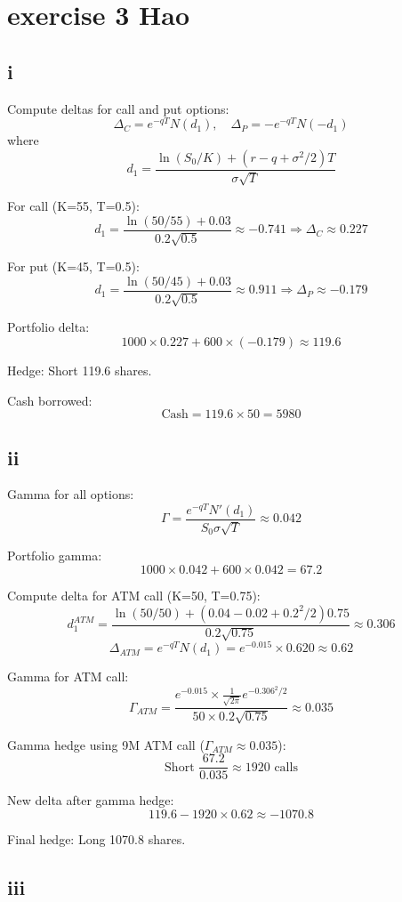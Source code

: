 \documentclass{article}
\begin{document}
\section{exercise 3 Hao}
\subsection{i}
Compute deltas for call and put options:
\[
\Delta_C = e^{-qT}N(d_1), \quad \Delta_P = -e^{-qT}N(-d_1)
\]
where
\[
d_1 = \frac{\ln(S_0/K)+(r-q+\sigma^2/2)T}{\sigma\sqrt{T}}
\]

For call (K=55, T=0.5):
\[
d_1 = \frac{\ln(50/55)+0.03}{0.2\sqrt{0.5}} \approx -0.741 \Rightarrow \Delta_C \approx 0.227
\]

For put (K=45, T=0.5):
\[
d_1 = \frac{\ln(50/45)+0.03}{0.2\sqrt{0.5}} \approx 0.911 \Rightarrow \Delta_P \approx -0.179
\]

Portfolio delta:
\[
1000\times0.227 + 600\times(-0.179) \approx 119.6
\]

Hedge: Short 119.6 shares.

Cash borrowed:
\[
\text{Cash} = 119.6 \times 50 = 5980
\]

\subsection{ii}

Gamma for all options:
\[
\Gamma = \frac{e^{-qT}N'(d_1)}{S_0\sigma\sqrt{T}} \approx 0.042
\]

Portfolio gamma:
\[
1000\times0.042 + 600\times0.042 = 67.2
\]

Compute delta for ATM call (K=50, T=0.75):
\[
d_1^{ATM} = \frac{\ln(50/50)+(0.04-0.02+0.2^2/2)0.75}{0.2\sqrt{0.75}} \approx 0.306
\]
\[
\Delta_{ATM} = e^{-qT}N(d_1) = e^{-0.015}\times0.620 \approx 0.62
\]

Gamma for ATM call:
\[
\Gamma_{ATM} = \frac{e^{-0.015}\times\frac{1}{\sqrt{2\pi}}e^{-0.306^2/2}}{50\times0.2\sqrt{0.75}} \approx 0.035
\]

Gamma hedge using 9M ATM call ($\Gamma_{ATM}\approx0.035$):
\[
\text{Short } \frac{67.2}{0.035} \approx 1920 \text{ calls}
\]

New delta after gamma hedge:
\[
119.6 - 1920\times0.62 \approx -1070.8
\]

Final hedge: Long 1070.8 shares.

\subsection{iii}
\end{document}
